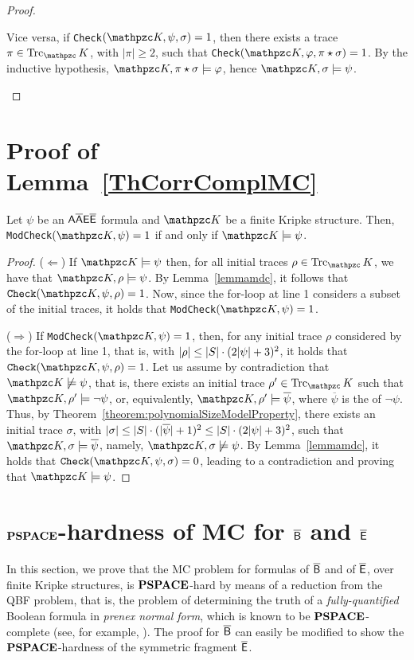 \begin{proof}
\begin{itemize}
    Vice versa, if \texttt{Check}$(\Ku,\psi,\sigma)=1$, then there exists a trace $\pi \in \Trk_\Ku$, with $|\pi|\geq 2$, such that \texttt{Check}$(\Ku,\varphi,\pi\star\sigma)=1$. By the inductive hypothesis, $\Ku,\pi\star\sigma\models \varphi$, hence $\Ku,\sigma\models \psi$.\qedhere
\end{itemize}
\end{proof}


\section{Proof of Lemma~\ref{ThCorrComplMC}}\label{proof:ThCorrComplMC}

\begin{theorem*}[\ref{ThCorrComplMC}]
Let $\psi$ be an $\mathsf{A\overline{A}E\overline{E}}$ formula and $\Ku$ be a finite Kripke structure. Then, \texttt{ModCheck}$(\Ku,\psi)=1$ if and only if $\Ku\models \psi$.
\end{theorem*}

\begin{proof}
	($\Leftarrow$)
	If $\Ku\models \psi$ then, for all initial traces $\rho\in\Trk_\Ku$, we have that $\Ku,\rho\models \psi$.
	By Lemma~\ref{lemmamdc},
it follows that $\texttt{Check}(\Ku,\psi,\rho)=1$. Now, since the for-loop at line 1 considers a subset of the initial traces, it holds that \texttt{ModCheck}$(\Ku,\psi)=1$.

    ($\Rightarrow$)
	If \texttt{ModCheck}$(\Ku,\psi)=1$, then, for any initial trace $\rho$ considered by the for-loop at line 1, that is, with $|\rho|\leq |S|\cdot (2|\psi|+3)^2$, it holds that $\texttt{Check}(\Ku,\psi,\rho)=1$.
	Let us assume by contradiction that $\Ku\not\models\psi$, that is, there exists an initial trace $\rho'\in\Trk_\Ku$ such that $\Ku,\rho'\models\neg\psi$, or, equivalently, $\Ku,\rho'\models\overline{\psi}$, where $\overline{\psi}$ is the \nnf{} of $\neg\psi$. Thus, by Theorem~\ref{theorem:polynomialSizeModelProperty}, there exists an initial trace $\sigma$, with $|\sigma|\leq |S|\cdot (|\overline{\psi}|+1)^2\leq |S|\cdot (2|\psi|+3)^2$, such that $\Ku,\sigma\models \overline{\psi}$, namely, $\Ku,\sigma\not\models\psi$. By Lemma~\ref{lemmamdc}, it holds that $\texttt{Check}(\Ku,\psi,\sigma)=0$, leading to a contradiction and proving that $\Ku\models \psi$.
\end{proof}


\section{$\textbf{PSPACE}$-hardness of MC for $\mathsf{\overline{B}}$ and $\mathsf{\overline{E}}$}\label{sect:BbarHard}
In this section, we prove that the MC problem for formulas of $\mathsf{\overline{B}}$ and of $\mathsf{\overline{E}}$, over finite Kripke structures, is $\textbf{PSPACE}$-hard by means of a reduction from 
the QBF problem, that is, the problem of determining the truth of a \emph{fully-quantified} Boolean formula in \emph{prenex normal form}, which is known to be $\textbf{PSPACE}$-complete (see, for example, \cite{Sip12}). The proof for  $\mathsf{\overline{B}}$ can easily be modified to show the $\textbf{PSPACE}$-hardness of the symmetric fragment $\mathsf{\overline{E}}$.

